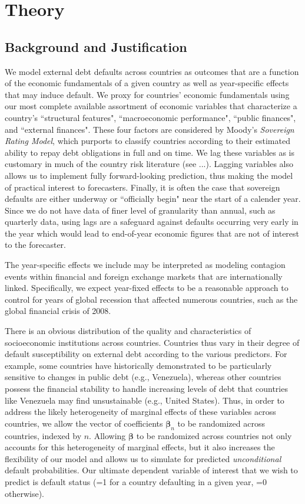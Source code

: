\documentclass[12pt]{article}
\begin{document}
\section{Theory} \label{sec:theory}

\subsection{Background and Justification}

We model external debt defaults across countries as outcomes that are a function of the economic fundamentals of a given country as well as year-specific effects that may induce default. We proxy for countries' economic fundamentals using our most complete available assortment of economic variables that characterize a country's ``structural features", ``macroeconomic performance", ``public finances", and ``external finances". These four factors are considered by Moody's \textit{Sovereign Rating Model}, which purports to classify countries according to their estimated ability to repay debt obligations in full and on time. We lag these variables as is customary in much of the country risk literature (see ...). Lagging variables also allows us to implement fully forward-looking prediction, thus making the model of practical interest to forecasters. Finally, it is often the case that sovereign defaults are either underway or ``officially begin" near the start of a calender year. Since we do not have data of finer level of granularity than annual, such as quarterly data, using lags are a safeguard against defaults occurring very early in the year which would lead to end-of-year economic figures that are not of interest to the forecaster.

The year-specific effects we include may be interpreted as modeling contagion events within financial and foreign exchange markets that are internationally linked. Specifically, we expect year-fixed effects to be a reasonable approach to control for years of global recession that affected numerous countries, such as the global financial crisis of 2008.

There is an obvious distribution of the quality and characteristics of socioeconomic institutions across countries. Countries thus vary in their degree of default susceptibility on external debt according to the various predictors. For example, some countries have historically demonstrated to be particularly sensitive to changes in public debt (e.g., Venezuela), whereas other countries possess the financial stability to handle increasing levels of debt that countries like Venezuela may find unsustainable (e.g., United States). Thus, in order to address the likely heterogeneity of marginal effects of these variables across countries, we allow the vector of coefficients $\boldsymbol{\beta}_n$ to be randomized across countries, indexed by $n$. Allowing $\boldsymbol{\beta}$ to be randomized across countries not only accounts for this heterogeneity of marginal effects, but it also increases the flexibility of our model and allows us to simulate for predicted \textit{unconditional} default probabilities.
Our ultimate dependent variable of interest that we wish to predict is default status (=1 for a country defaulting in a given year, =0 otherwise). 
\end{document}
